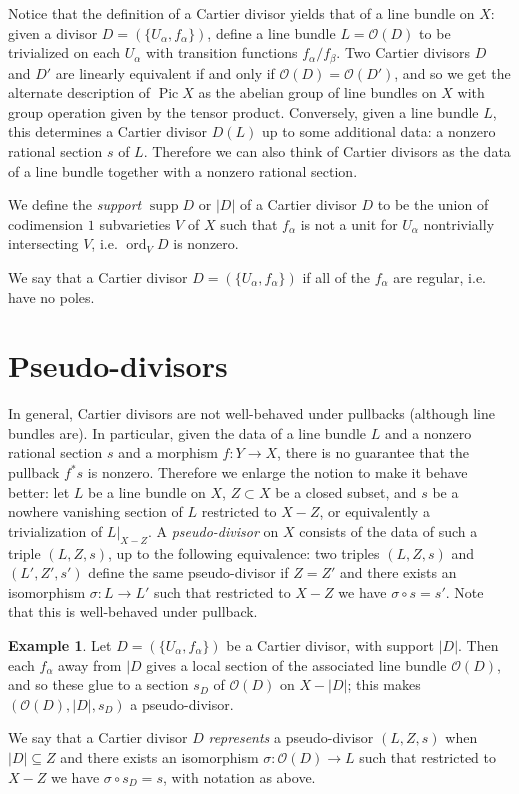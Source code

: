 \documentclass[leqno, openany]{memoir}
\theoremstyle{definition}
\newtheorem{exm}[thm]{Example}
\theoremstyle{remark}
\theoremstyle{plain}
\theoremstyle{definition}
\theoremstyle{remark}
\newcommand{\msc}[1]{\mathscr{#1}}
\DeclareMathOperator{\Pic}{Pic}
\DeclareMathOperator{\supp}{supp}
\DeclareMathOperator{\ord}{ord}
\begin{document}
Notice that the definition of a Cartier divisor yields that of a line bundle on $X$: given a divisor $D = (\{U_\alpha, f_\alpha\})$, define a line bundle $L = \msc{O}(D)$ to be trivialized on each $U_\alpha$ with transition functions $f_\alpha/f_\beta$. Two Cartier divisors $D$ and $D'$ are linearly equivalent if and only if $\msc{O}(D) = \msc{O}(D')$, and so we get the alternate description of $\Pic X$ as the abelian group of line bundles on $X$ with group operation given by the tensor product. Conversely, given a line bundle $L$, this determines a Cartier divisor $D(L)$ up to some additional data: a nonzero rational section $s$ of $L$. Therefore we can also think of Cartier divisors as the data of a line bundle together with a nonzero rational section.

We define the \textit{support} $\supp D$ or $|D|$ of a Cartier divisor $D$ to be the union of codimension $1$ subvarieties $V$ of $X$ such that $f_\alpha$ is not a unit for $U_\alpha$ nontrivially intersecting $V$, i.e. $\ord_V D$ is nonzero.

We say that a Cartier divisor $D = (\{U_\alpha, f_\alpha\})$ if all of the $f_\alpha$ are regular, i.e. have no poles.

\section{Pseudo-divisors}
In general, Cartier divisors are not well-behaved under pullbacks (although line bundles are). In particular, given the data of a line bundle $L$ and a nonzero rational section $s$ and a morphism $f\colon Y \to X$, there is no guarantee that the pullback $f^* s$ is nonzero. Therefore we enlarge the notion to make it behave better: let $L$ be a line bundle on $X$, $Z \subset X$ be a closed subset, and $s$ be a nowhere vanishing section of $L$ restricted to $X-Z$, or equivalently a trivialization of $L|_{X-Z}$. A \textit{pseudo-divisor} on $X$ consists of the data of such a triple $(L,Z,s)$, up to the following equivalence: two triples $(L,Z,s)$ and $(L',Z',s')$ define the same pseudo-divisor if $Z = Z'$ and there exists an isomorphism $\sigma\colon L \to L'$ such that restricted to $X-Z$ we have $\sigma \circ s = s'$. Note that this is well-behaved under pullback.

\begin{exm}
Let $D = (\{U_\alpha, f_\alpha\})$ be a Cartier divisor, with support $|D|$. Then each $f_\alpha$ away from $|D$ gives a local section of the associated line bundle $\msc{O}(D)$, and so these glue to a section $s_D$ of $\msc{O}(D)$ on $X-|D|$; this makes $(\msc{O}(D), |D|, s_D)$ a pseudo-divisor.

We say that a Cartier divisor $D$ \textit{represents} a pseudo-divisor $(L,Z,s)$ when $|D| \subseteq Z$ and there exists an isomorphism $\sigma\colon \msc{O}(D) \to L$ such that restricted to $X-Z$ we have $\sigma \circ s_D = s$, with notation as above.
\end{exm}
\end{document}
